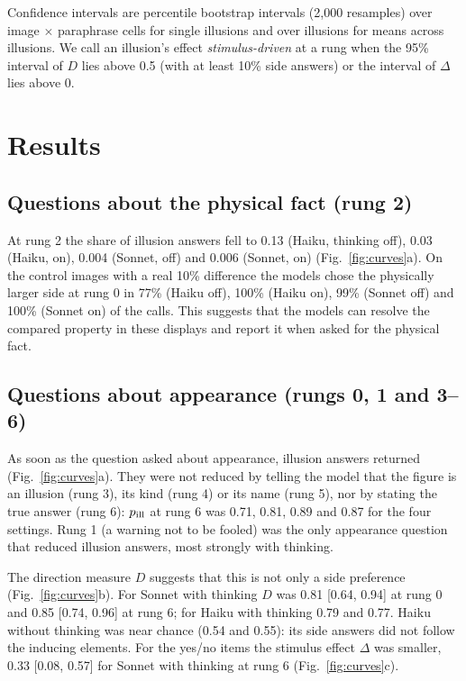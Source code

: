 \documentclass[11pt]{article}
\begin{document}
Confidence intervals are percentile bootstrap intervals (2,000 resamples) over image $\times$ paraphrase cells for
single illusions and over illusions for means across illusions. We call an illusion's effect \emph{stimulus-driven} at
a rung when the 95\% interval of $D$ lies above 0.5 (with at least 10\% side answers) or the interval of $\Delta$ lies
above 0.

\section{Results}

\subsection{Questions about the physical fact (rung 2)}

At rung 2 the share of illusion answers fell to 0.13 (Haiku, thinking off), 0.03 (Haiku, on), 0.004 (Sonnet, off)
and 0.006 (Sonnet, on) (Fig.~\ref{fig:curves}a). On the control images with a real 10\% difference the models chose
the physically larger side at rung 0 in 77\% (Haiku off), 100\% (Haiku on), 99\% (Sonnet off) and 100\% (Sonnet on) of
the calls. This suggests that the models can resolve the compared property in these displays and report it when asked for the physical fact.

\subsection{Questions about appearance (rungs 0, 1 and 3--6)}

As soon as the question asked about appearance, illusion answers returned (Fig.~\ref{fig:curves}a). They were not
reduced by telling the model that the figure is an illusion (rung 3), its kind (rung 4) or its name (rung 5), nor by
stating the true answer (rung 6): $p_{\rm ill}$ at rung 6 was 0.71, 0.81, 0.89 and 0.87 for the four settings. Rung 1
(a warning not to be fooled) was the only appearance question that reduced illusion answers, most strongly with
thinking.

The direction measure $D$ suggests that this is not only a side preference (Fig.~\ref{fig:curves}b). For Sonnet with thinking
$D$ was 0.81 [0.64, 0.94] at rung 0 and 0.85 [0.74, 0.96] at rung 6; for Haiku with thinking 0.79 and 0.77. Haiku
without thinking was near chance (0.54 and 0.55): its side answers did not follow the inducing elements. For the
yes/no items the stimulus effect $\Delta$ was smaller, 0.33 [0.08, 0.57] for Sonnet with thinking at rung 6
(Fig.~\ref{fig:curves}c).
\end{document}
